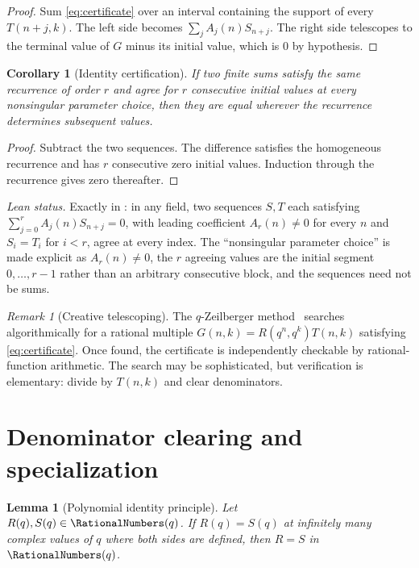 \documentclass[11pt,a4paper,oneside,openany]{book}
\newtheorem{lemma}[lemma]{Lemma}
\newtheorem{corollary}[corollary]{Corollary}
\theoremstyle{definition}
\theoremstyle{remark}
\newtheorem{remark}[remark]{Remark}
\begin{document}
\begin{proof}
Sum \eqref{eq:certificate} over an interval containing the support of every $T(n+j,k)$.  The left side becomes
$\sum_jA_j(n)S_{n+j}$.  The right side telescopes to the terminal value of $G$ minus its initial value, which is $0$ by hypothesis.
\end{proof}

\begin{corollary}[Identity certification]\label{cor:identity-certification}
If two finite sums satisfy the same recurrence of order $r$ and agree for $r$ consecutive initial values at every nonsingular parameter choice, then they are equal wherever the recurrence determines subsequent values.
\end{corollary}

\begin{proof}
Subtract the two sequences.  The difference satisfies the homogeneous recurrence and has $r$ consecutive zero initial values.  Induction through the recurrence gives zero thereafter.
\end{proof}
\emph{Lean status.}  Exactly  in :
in any field, two sequences \(S,T\) each satisfying \(\sum_{j=0}^{r}A_j(n)S_{n+j}=0\), with leading
coefficient \(A_r(n)\ne0\) for every \(n\) and \(S_i=T_i\) for \(i<r\), agree at every index.  The
``nonsingular parameter choice'' is made explicit as \(A_r(n)\ne0\), the \(r\) agreeing values are the
initial segment \(0,\dots,r-1\) rather than an arbitrary consecutive block, and the sequences need not
be sums.


\begin{remark}[Creative telescoping]
The $q$-Zeilberger method~\cite{PetkovsekWilfZeilberger1996} searches algorithmically for a rational multiple $G(n,k)=R(q^n,q^k)T(n,k)$ satisfying \eqref{eq:certificate}.  Once found, the certificate is independently checkable by rational-function arithmetic.  The search may be sophisticated, but verification is elementary: divide by $T(n,k)$ and clear denominators.
\end{remark}

\section{Denominator clearing and specialization}

\begin{lemma}[Polynomial identity principle]\label{lem:polynomial-identity-principle}
Let $R(q),S(q)\in\RationalNumbers(q)$.  If $R(q)=S(q)$ at infinitely many complex values of $q$ where both sides are defined, then $R=S$ in $\RationalNumbers(q)$.
\end{lemma}
\end{document}
